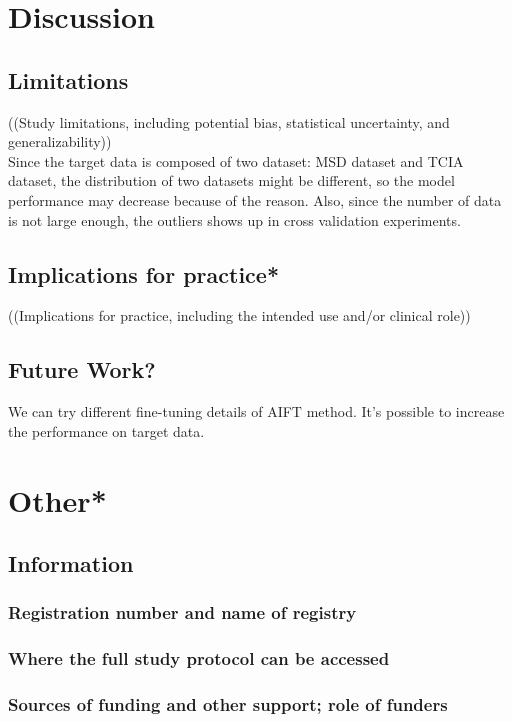 \chapter{Discussion}
\section{Limitations} 
((Study limitations, including potential bias, statistical uncertainty, and generalizability)) \\
Since the target data is composed of two dataset: MSD dataset and TCIA dataset, the distribution of two datasets might be different, so the model performance may decrease because of the reason. Also, since the number of data is not large enough, the outliers shows up in cross validation experiments. 

\section{Implications for practice*}
((Implications for practice, including the intended use and/or clinical role)) \\

\section{Future Work?}
We can try different fine-tuning details of AIFT method. It's possible to increase the performance on target data. 

\chapter{Other*}
\section{Information}

\subsection{Registration number and name of registry}
\subsection{Where the full study protocol can be accessed}
\subsection{Sources of funding and other support; role of funders}